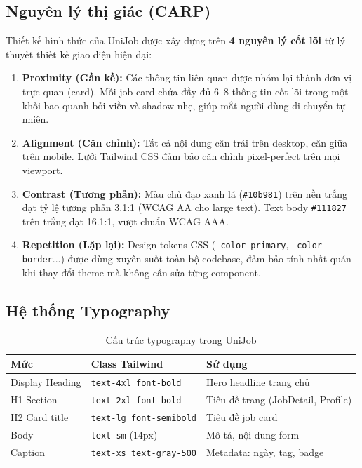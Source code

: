 \subsection{Nguyên lý thị giác (CARP)}

Thiết kế hình thức của UniJob được xây dựng trên \textbf{4 nguyên lý cốt lõi} từ lý thuyết
thiết kế giao diện hiện đại:

\begin{enumerate}
  \item \textbf{Proximity (Gần kề):} Các thông tin liên quan được nhóm lại thành
    đơn vị trực quan (card). Mỗi job card chứa đầy đủ 6--8 thông tin cốt lõi trong một
    khối bao quanh bởi viền và shadow nhẹ, giúp mắt người dùng di chuyển tự nhiên.

  \item \textbf{Alignment (Căn chỉnh):} Tất cả nội dung căn trái trên desktop, căn giữa
    trên mobile. Lưới Tailwind CSS đảm bảo căn chỉnh pixel-perfect trên mọi viewport.

  \item \textbf{Contrast (Tương phản):} Màu chủ đạo xanh lá (\texttt{\#10b981}) trên nền
    trắng đạt tỷ lệ tương phản 3.1:1 (WCAG AA cho large text). Text body \texttt{\#111827}
    trên trắng đạt 16.1:1, vượt chuẩn WCAG AAA.

  \item \textbf{Repetition (Lặp lại):} Design tokens CSS (\texttt{--color-primary},
    \texttt{--color-border}...) được dùng xuyên suốt toàn bộ codebase, đảm bảo tính nhất
    quán khi thay đổi theme mà không cần sửa từng component.
\end{enumerate}

\subsection{Hệ thống Typography}

\begin{table}[H]
\centering
\caption{Cấu trúc typography trong UniJob}
\renewcommand{\arraystretch}{1.2}
\begin{tabularx}{\textwidth}{|p{3.5cm}|p{3.5cm}|X|}
\hline
\textbf{Mức} & \textbf{Class Tailwind} & \textbf{Sử dụng} \\
\hline
Display Heading & \texttt{text-4xl font-bold} & Hero headline trang chủ \\
\hline
H1 Section      & \texttt{text-2xl font-bold} & Tiêu đề trang (JobDetail, Profile) \\
\hline
H2 Card title   & \texttt{text-lg font-semibold} & Tiêu đề job card \\
\hline
Body            & \texttt{text-sm} (14px)     & Mô tả, nội dung form \\
\hline
Caption         & \texttt{text-xs text-gray-500} & Metadata: ngày, tag, badge \\
\hline
\end{tabularx}
\end{table}

